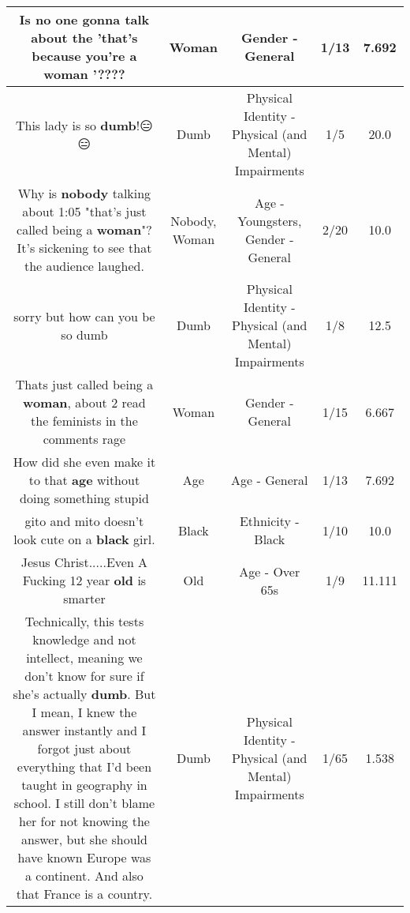 \documentclass[11pt]{article}
\newlength\mylength
\begin{document}
\begin{center}
\begin{longtable}{|C{.65\mylength}|C{.30\mylength}|C{.12\mylength}|C{.12\mylength}|C{.12\mylength}|}
  \small Is no one gonna talk about the 'that's because you're a \textbf{woman} '????\normalsize   & Woman & Gender - General & 1/13 & 7.692 \\  \hline
  \small This lady is so \textbf{dumb}!😑😑\normalsize   & Dumb & Physical Identity - Physical (and Mental) Impairments & 1/5 & 20.0 \\  \hline
  \small Why is \textbf{nobody} talking about 1:05 "that's just called being a \textbf{woman}"? It's sickening to see that the audience laughed.\normalsize   & Nobody, Woman & Age - Youngsters, Gender - General & 2/20 & 10.0 \\  \hline
  \small sorry but how can you be so dumb\normalsize   & Dumb & Physical Identity - Physical (and Mental) Impairments & 1/8 & 12.5 \\  \hline
  \small Thats just called being a \textbf{woman}, about 2 read the feminists in the comments rage\normalsize   & Woman & Gender - General & 1/15 & 6.667 \\  \hline
  \small How did she even make it to that \textbf{age} without doing something stupid\normalsize   & Age & Age - General & 1/13 & 7.692 \\  \hline
  \small gito and mito doesn't look cute on a \textbf{black} girl.\normalsize   & Black & Ethnicity - Black & 1/10 & 10.0 \\  \hline
  \small Jesus Christ.....Even A Fucking 12 year \textbf{old} is smarter\normalsize   & Old & Age - Over 65s & 1/9 & 11.111 \\  \hline
  \small Technically, this tests knowledge and not intellect, meaning we don't know for sure if she's actually \textbf{dumb}. But I mean, I knew the answer instantly and I forgot just about everything that I'd been taught in geography in school. I still don't blame her for not knowing the answer, but she should have known Europe was a continent. And also that France is a country.\normalsize   & Dumb & Physical Identity - Physical (and Mental) Impairments & 1/65 & 1.538 \\  \hline

\end{longtable}
\end{center}
\end{document}
